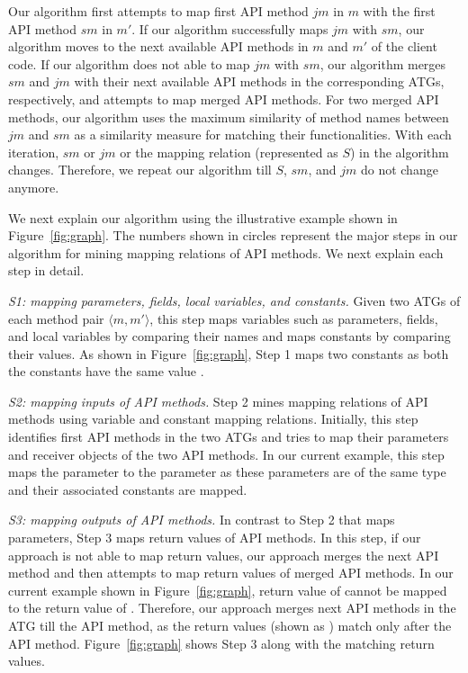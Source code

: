 Our algorithm first attempts to map first API method $jm$ in $m$
with the first API method $sm$ in $m'$. If our algorithm successfully maps $jm$ with
$sm$, our algorithm moves to the next available API methods in $m$
and $m'$ of the client code. If our algorithm does not able to map $jm$
with $sm$, our algorithm merges $sm$ and $jm$ with their next available API methods
in the corresponding ATGs, respectively, and attempts to map merged API methods.
For two merged API methods, our algorithm uses the
maximum similarity of method names between $jm$ and $sm$ as a
similarity measure for matching their functionalities.
With each iteration, $sm$ or $jm$ or the mapping relation (represented as $S$)
in the algorithm changes. Therefore, we repeat our algorithm
till $S$, $sm$, and $jm$ do not change anymore.

We next explain our algorithm using the illustrative example shown
in Figure~\ref{fig:graph}. The numbers shown in circles
represent the major steps in our algorithm for mining mapping
relations of API methods. We next explain each step in detail.

\emph{S1: mapping parameters, fields, local variables, and constants.}
Given two ATGs of each method pair $\langle m, m' \rangle$, this step maps
variables such as parameters, fields, and local variables by comparing their names
and maps constants by comparing their values. As shown in
Figure~\ref{fig:graph}, Step 1 maps two constants as both the constants
have the same value .

\emph{S2: mapping inputs of API methods.} Step 2 mines mapping
relations of API methods using variable and constant mapping relations.
Initially, this step identifies first API methods in the two ATGs and tries to
map their parameters and receiver objects of the two API methods.
In our current example, this step maps the parameter 
to the parameter  as these parameters
are of the same type and their associated constants are mapped.

\emph{S3: mapping outputs of API methods.} In contrast to Step 2
that maps parameters, Step 3 maps return values of API methods. In
this step, if our approach is not able to map return values, our
approach merges the next API method and then attempts to map return
values of merged API methods. In our current example shown in
Figure~\ref{fig:graph}, return value of
 cannot be mapped to the
return value of . Therefore, our
approach merges next API methods in the ATG till the 
API method, as the return values (shown as ) match
only after the  API method. Figure~\ref{fig:graph}
shows Step 3 along with the matching return values.

